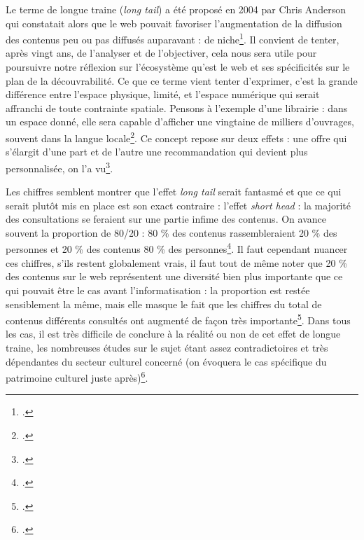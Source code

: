 Le terme de longue traine (\textit{long tail}) a été proposé en 2004 par Chris Anderson qui constatait alors que le web pouvait favoriser l’augmentation de la diffusion des contenus peu ou pas diffusés auparavant : de niche\footcite[§ 8]{benghozi_longue_2008}. Il convient de tenter, après vingt ans, de l’analyser et de l’objectiver, cela nous sera utile pour poursuivre notre réflexion sur l’écosystème qu’est le web et ses spécificités sur le plan de la découvrabilité. Ce que ce terme vient tenter d’exprimer, c’est la grande différence entre l’espace physique, limité, et l’espace numérique qui serait affranchi de toute contrainte spatiale. Pensons à l’exemple d’une librairie : dans un espace donné, elle sera capable d’afficher une vingtaine de milliers d’ouvrages, souvent dans la langue locale\footcite[§ 11 et § 12]{benghozi_longue_2008}. Ce concept repose sur deux effets : une offre qui s’élargit d’une part et de l’autre une recommandation qui devient plus personnalisée, on l’a vu\footcite[§ 17]{bourreau2015a}.

Les chiffres semblent montrer que l’effet \textit{long tail} serait fantasmé et que ce qui serait plutôt mis en place est son exact contraire : l’effet \textit{short head} : la majorité des consultations se feraient sur une partie infime des contenus. On avance souvent la proportion de 80/20 : 80 \% des contenus rassembleraient 20 \% des personnes et 20 \% des contenus 80 \% des personnes\footcite[§ 10]{bourreau2015a}. Il faut cependant nuancer ces chiffres, s’ils restent globalement vrais, il faut tout de même noter que 20 \% des contenus sur le web représentent une diversité bien plus importante que ce qui pouvait être le cas avant l’informatisation : la proportion est restée sensiblement la même, mais elle masque le fait que les chiffres du total de contenus différents consultés ont augmenté de façon très importante\footcite[§ 15]{bourreau2015a}. Dans tous les cas, il est très difficile de conclure à la réalité ou non de cet effet de longue traine, les nombreuses études sur le sujet étant assez contradictoires et très dépendantes du secteur culturel concerné (on évoquera le cas spécifique du patrimoine culturel juste après)\footcite[tableau 1]{bourreau2015a}.

